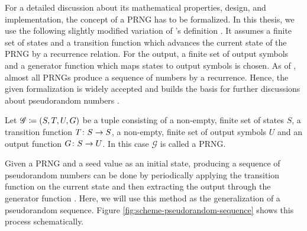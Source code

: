 \documentclass{stdlocal}
\begin{document}
    For a detailed discussion about its mathematical properties, design, and implementation, the concept of a PRNG has to be formalized.
    In this thesis, we use the following slightly modified variation of \citeauthor{lecuyer1994}'s definition \autocite{lecuyer1994,lecuyer2015,barash2017,bauke2007}.
    It assumes a finite set of states and a transition function which advances the current state of the PRNG by a recurrence relation.
    For the output, a finite set of output symbols and a generator function which maps states to output symbols is chosen.
    As of \textcite{bauke2007}, almost all PRNGs produce a sequence of numbers by a recurrence.
    Hence, the given formalization is widely accepted and builds the basis for further discussions about pseudorandom numbers \autocite{lecuyer1994,lecuyer2015,barash2017,bauke2007}.

    \begin{definition}
      Let $\mathscr{G}\coloneqq (S,T,U,G)$ be a tuple consisting of a non-empty, finite set of states $S$, a transition function $T\colon S\to S$, a non-empty, finite set of output symbols $U$ and an output function $G\colon S\to U$.
      In this case $\mathscr{G}$ is called a PRNG.
    \end{definition}
    Given a PRNG and a seed value as an initial state, producing a sequence of pseudorandom numbers can be done by periodically applying the transition function on the current state and then extracting the output through the generator function \autocite{barash2017,lecuyer1994,lecuyer2015}.
    Here, we will use this method as the generalization of a pseudorandom sequence.
    Figure \ref{fig:scheme-pseudorandom-sequence} shows this process schematically.
\end{document}
